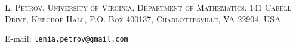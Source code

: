 \documentclass[letterpaper,11pt,oneside,reqno]{article}
\numberwithin{equation}{section}
\theoremstyle{definition}
\begin{document}




\medskip

\textsc{L. Petrov, University of Virginia, Department of Mathematics, 141 Cabell Drive, Kerchof Hall, P.O. Box 400137, Charlottesville, VA 22904, USA}

E-mail: \texttt{lenia.petrov@gmail.com}
\end{document}
